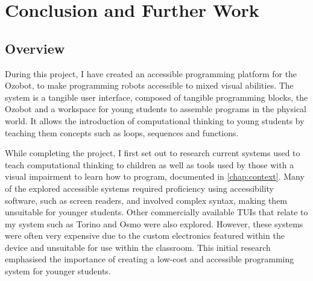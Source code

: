 \documentclass[oneside,%
                    author={Malak Hajji},
                    degree={BSc},
                    title={Designing An Accessible Computational Toolkit For Students},
                  subtitle={With Mixed Visual Abilities}]{dissertation}
\begin{document}
\chapter{Conclusion and Further Work}
\label{chap:conclusion}

\noindent
\section{Overview}
During this project, I have created an accessible programming platform for the Ozobot, to make programming robots accessible to mixed visual abilities. The system is a tangible user interface, composed of tangible programming blocks, the Ozobot and a workspace for young students to assemble programs in the physical world. It allows the introduction of computational thinking to young students by teaching them concepts such as loops, sequences and functions.


While completing the project, I first set out to research current systems used to teach computational thinking to children as well as tools used by those with a visual impairment to learn how to program, documented in \ref{chap:context}. Many of the explored accessible systems required proficiency using accessibility software, such as screen readers, and involved complex syntax, making them unsuitable for younger students. Other commercially available TUIs that relate to my system such as Torino and Osmo were also explored. However, these systems were often very expensive due to the custom electronics featured within the device and unsuitable for use within the classroom. This initial research emphasised the importance of creating a low-cost and accessible programming system for younger students.
\end{document}
